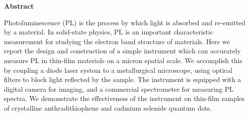 \thispagestyle{plain}
\begin{center}
 
 
    \textbf{Abstract}
\end{center}

Photoluminescence (PL) is the process by which light is absorbed and re-emitted by a material. In solid-state physics, PL is an important characteristic measurement for studying the electron band structure of materials. Here we report the design and construction of a simple instrument which can accurately measure PL in thin-film materials on a micron spatial scale. We accomplish this by coupling a diode laser system to a metallurgical microscope, using optical filters to block light reflected by the sample. The instrument is equipped with a digital camera for imaging, and a commercial spectrometer for measuring PL spectra. We demonstrate the effectiveness of the instrument on thin-film samples of crystalline anthradithiophene and cadmium selenide quantum dots.

